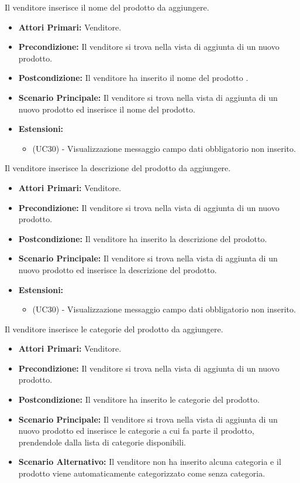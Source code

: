\resetSubUC

Il venditore inserisce il nome del prodotto da aggiungere.
\begin{itemize}
    \item \textbf{Attori Primari:} Venditore.
    \item \textbf{Precondizione:} Il venditore si trova nella vista di aggiunta di un nuovo prodotto.
    \item \textbf{Postcondizione:} Il venditore ha inserito il nome del prodotto .
    \item \textbf{Scenario Principale:} Il venditore si trova nella vista di aggiunta di un nuovo prodotto ed inserisce il nome del prodotto.
    \item \textbf{Estensioni:}
    \begin{itemize}
        \item (UC30) - Visualizzazione messaggio campo dati obbligatorio non inserito.
    \end{itemize}
\end{itemize}

Il venditore inserisce la descrizione del prodotto da aggiungere.
\begin{itemize}
    \item \textbf{Attori Primari:} Venditore.
    \item \textbf{Precondizione:} Il venditore si trova nella vista di aggiunta di un nuovo prodotto.
    \item \textbf{Postcondizione:} Il venditore ha inserito la descrizione del prodotto.
    \item \textbf{Scenario Principale:} Il venditore si trova nella vista di aggiunta di un nuovo prodotto ed inserisce la descrizione del prodotto.
    \item \textbf{Estensioni:}
    \begin{itemize}
        \item (UC30) - Visualizzazione messaggio campo dati obbligatorio non inserito.
    \end{itemize}
\end{itemize}

Il venditore inserisce le categorie del prodotto da aggiungere.
\begin{itemize}
    \item \textbf{Attori Primari:} Venditore.
    \item \textbf{Precondizione:} Il venditore si trova nella vista di aggiunta di un nuovo prodotto.
    \item \textbf{Postcondizione:} Il venditore ha inserito le categorie del prodotto.
    \item \textbf{Scenario Principale:} Il venditore si trova nella vista di aggiunta di un nuovo prodotto ed inserisce le categorie a cui fa parte il prodotto, prendendole dalla lista di categorie disponibili.
    \item \textbf{Scenario Alternativo:} Il venditore non ha inserito alcuna categoria e il prodotto viene automaticamente categorizzato come senza categoria.
\end{itemize}

